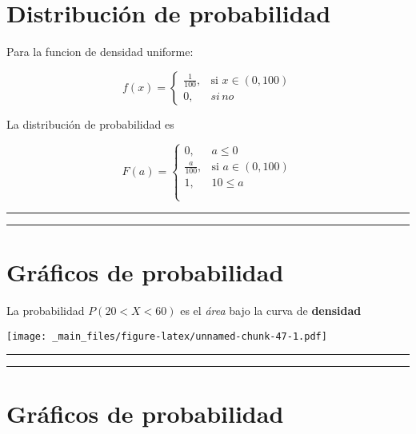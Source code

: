 \documentclass[
]{book}
\begin{document}
\hypertarget{distribuciuxf3n-de-probabilidad-5}{%
\section{Distribución de probabilidad}\label{distribuciuxf3n-de-probabilidad-5}}

Para la funcion de densidad uniforme:

\[
    f(x)= 
\begin{cases}
    \frac{1}{100},& \text{si } x\in (0,100)\\
    0,& si \,no 
\end{cases}
\]

La distribución de probabilidad es

\[
    F(a)= 
\begin{cases}
    0,& a \leq 0 \\
    \frac{a}{100},& \text{si } a\in (0,100)\\
    1, & 10 \leq a \\
    \\
\end{cases}
\]

\begin{center}\rule{0.5\linewidth}{0.5pt}\end{center}

\begin{center}\rule{0.5\linewidth}{0.5pt}\end{center}

\hypertarget{gruxe1ficos-de-probabilidad}{%
\section{Gráficos de probabilidad}\label{gruxe1ficos-de-probabilidad}}

La probabilidad \(P(20<X<60)\) es el \emph{área} bajo la curva de \textbf{densidad}

\texttt{[image: \_main\_files/figure-latex/unnamed-chunk-47-1.pdf]}

\begin{center}\rule{0.5\linewidth}{0.5pt}\end{center}

\begin{center}\rule{0.5\linewidth}{0.5pt}\end{center}

\hypertarget{gruxe1ficos-de-probabilidad-1}{%
\section{Gráficos de probabilidad}\label{gruxe1ficos-de-probabilidad-1}}
\end{document}
